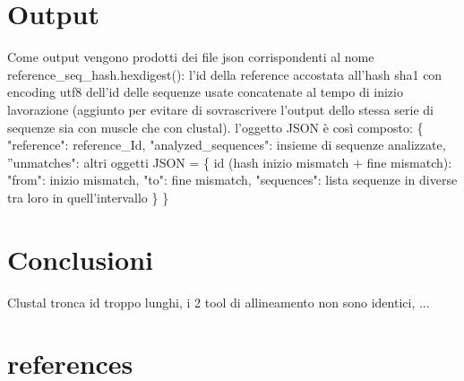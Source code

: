 \documentclass[11pt,italian]{article}
\begin{document}
\section{Output}
	Come output vengono prodotti dei file json corrispondenti al nome reference\_seq\_hash.hexdigest(): l'id della reference accostata all'hash sha1 con encoding utf8 dell'id delle sequenze usate concatenate al tempo di inizio lavorazione (aggiunto per evitare di sovrascrivere l'output dello stessa serie di sequenze sia con muscle che con clustal).\newline
	l'oggetto JSON è così composto: \{ "reference": reference\_Id, \newline "analyzed\_sequences": insieme di sequenze analizzate, \newline
 	''unmatches": altri oggetti JSON = \newline\{ id (hash inizio mismatch + fine mismatch): "from": inizio mismatch, \newline
   "to": fine mismatch, \newline
   "sequences": lista sequenze in diverse tra loro in quell'intervallo \} \newline
 \}

\section{Conclusioni}
	Clustal tronca id troppo lunghi, i 2 tool di allineamento non sono identici, ...
\section{references}
\end{document}
